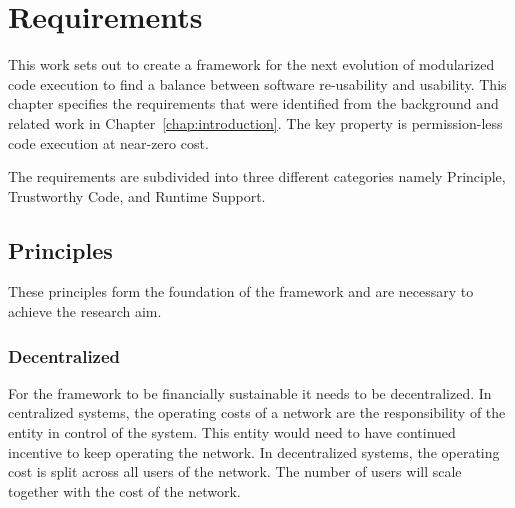 \chapter{\label{chap:requirements}Requirements}



%

This work sets out to create a framework for the next evolution of modularized code execution to find a balance between software re-usability and usability. This chapter specifies the requirements that were identified from the background and related work in Chapter~\ref{chap:introduction}. The key property is permission-less code execution at near-zero cost.



The requirements are subdivided into three different categories namely Principle, Trustworthy Code, and Runtime Support.

\section{Principles}

These principles form the foundation of the framework and are necessary to achieve the research aim.

\subsection*{Decentralized}

For the framework to be financially sustainable it needs to be decentralized. In centralized systems, the operating costs of a network are the responsibility of the entity in control of the system. This entity would need to have continued incentive to keep operating the network. In decentralized systems, the operating cost is split across all users of the network. The number of users will scale together with the cost of the network.

